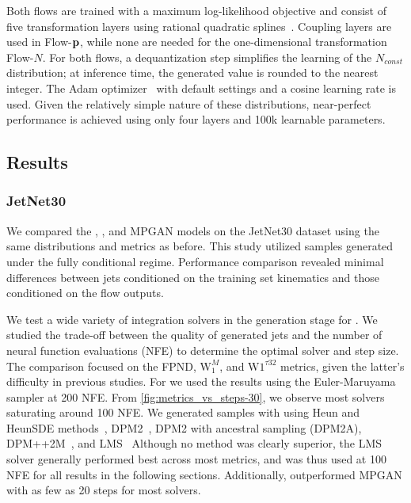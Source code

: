 Both flows are trained with a maximum log-likelihood objective and consist of five transformation layers using rational quadratic splines~\cite{NeuralSplineFlows}.
Coupling layers are used in Flow-$\mathbf{p}$, while none are needed for the one-dimensional transformation Flow-$N$.
For both flows, a dequantization step simplifies the learning of the $N_{const}$ distribution; at inference time, the generated value is rounded to the nearest integer.
The Adam optimizer~\cite{Adam} with default settings and a cosine learning rate is used.
Given the relatively simple nature of these distributions, near-perfect performance is achieved using only four layers and 100k learnable parameters.

\subsection{Results}

\subsubsection{JetNet30}

We compared the \pcdroid, \pcjedi, and MPGAN models on the JetNet30 dataset using the same distributions and metrics as before.
This study utilized \pcdroid samples generated under the fully conditional regime.
Performance comparison revealed minimal differences between jets conditioned on the training set kinematics and those conditioned on the flow outputs.

We test a wide variety of integration solvers in the generation stage for \pcjedi.
We studied the trade-off between the quality of generated jets and the number of neural function evaluations (NFE) to determine the optimal solver and step size.
The comparison focused on the FPND, $\mathrm{W}_1^M$, and $\mathrm{W}1^{\tau{32}}$ metrics, given the latter's difficulty in previous studies.
For \pcjedi we used the results using the Euler-Maruyama sampler at 200 NFE.
From \cref{fig:metrics_vs_steps-30}, we observe most solvers saturating around 100 NFE.
We generated samples with \pcdroid using Heun and HeunSDE methods~\cite{ElucidatingDesignSpace}, DPM2~\cite{DPMSolverFastODE}, DPM2 with ancestral sampling (DPM2A), DPM++2M~\cite{DPMSolverFastSolver}, and LMS~\cite{ODEBook}
Although no method was clearly superior, the LMS solver generally performed best across most metrics, and was thus used at 100 NFE for all \pcdroid results in the following sections.
Additionally, \pcdroid outperformed MPGAN with as few as 20 steps for most solvers.

